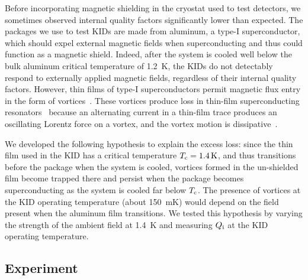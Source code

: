 Before incorporating magnetic shielding in the cryostat used to test detectors, we sometimes observed internal quality factors significantly lower than expected.
The packages we use to test KIDs are made from aluminum, a type-I superconductor, which should expel external magnetic fields when superconducting and thus could function as a magnetic shield.
Indeed, after the system is cooled well below the bulk aluminum critical temperature of \SI{1.2}{K}, the KIDs do not detectably respond to externally applied magnetic fields, regardless of their internal quality factors.
However, thin films of type-I superconductors permit magnetic flux entry in the form of vortices~\autocite{Tinkham1963PR,Dolan1974aJLTP}.
These vortices produce loss in thin-film superconducting resonators~\autocite{Song2009PRB,Wang2009APL,Mazin2010APL,Bothner2011APL,Bothner2012PRB,deGraaf2012JAP,Nsanzineza2014PRL,Chiaro2016SUST} because an alternating current in a thin-film trace produces an oscillating Lorentz force on a vortex, and the vortex motion is dissipative~\autocite{Song2009PRB}.

We developed the following hypothesis to explain the excess loss: since the thin film used in the KID has a critical temperature $T_{\mathrm{c}} = \SI{1.4}{K}$, and thus transitions before the package when the system is cooled, vortices formed in the un-shielded film become trapped there and persist when the package becomes superconducting as the system is cooled far below $T_{\mathrm{c}}$.
The presence of vortices at the KID operating temperature (about \SI{150}{mK}) would depend on the field present when the aluminum film transitions.
We tested this hypothesis by varying the strength of the ambient field at \SI{1.4}{K} and measuring $Q_{\mathrm{i}}$ at the KID operating temperature.


\subsection{Experiment}

